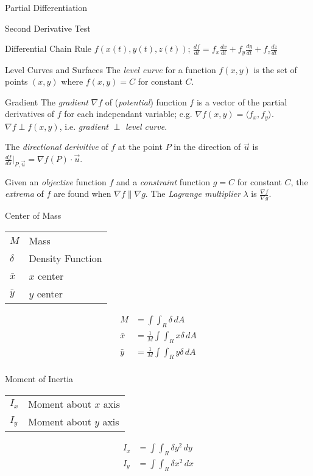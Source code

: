 \begin{section}{Partial Differentiation}
\begin{section}{Second Derivative Test}
  \end{section}
  \begin{section}{Differential Chain Rule}
    $f(x(t),y(t),z(t))$;
    $\frac{df}{dt}=
    f_{x}\frac{dx}{dt} + f_{y}\frac{dy}{dt} + f_{z}\frac{dz}{dt}$
  \end{section}

  \begin{section}{Level Curves and Surfaces}
    The \emph{level curve} for a function $f(x,y)$ is the set of
    points $(x,y)$ where $f(x,y)=C$ for constant $C$.
  \end{section}

  \begin{section}{Gradient}
    The \emph{gradient} $\nabla{f}$ of (\emph{potential})
    function $f$ is a vector of the
    partial derivatives of $f$ for each independant variable; e.g.
    $\nabla f(x,y) = \langle f_x,f_y \rangle $.
    $\nabla{f} \perp f(x,y)$, i.e.  \emph{gradient} $\perp$
    \emph{level curve}.

    The \emph{directional derivitive} of $f$ at the point $P$ in the
    direction of $\vec{u}$ is
    $\frac{df}{ds}\biggr\rvert_{P,\vec{u}}=\nabla{f}(P)\cdot\vec{u}$.

    Given an \emph{objective} function $f$ and a \emph{constraint}
    function $g=C$ for constant $C$, the \emph{extrema} of $f$
    are found when $\nabla{f} \parallel \nabla{g}$. The
    \emph{Lagrange multiplier} $\lambda$ is
    $\frac{\nabla{f}}{\nabla{g}}$.
  \end{section}
  \begin{section}{Center of Mass}
    \begin{tabular}{l l}
      $M$ & Mass\\
      $\delta$ & Density Function\\
      $\bar{x}$ & $x$ center\\
      $\bar{y}$ & $y$ center\\
    \end{tabular}
    \begin{align*}
      M&=\int\int_R{\delta} \,dA\\
      \bar{x}&=\frac{1}{M}\int\int_R{x\delta} \,dA\\
      \bar{y}&=\frac{1}{M}\int\int_R{y\delta} \,dA\\
    \end{align*}
  \end{section}

  \begin{section}{Moment of Inertia}
    \begin{tabular}{l l}
      $I_x$ & Moment about $x$ axis \\
      $I_y$ & Moment about $y$ axis \\
    \end{tabular}
    \begin{align*}
      I_x&=\int\int_R{\delta}y^2 \,dy\\
      I_y&=\int\int_R{\delta}x^2 \,dx\\
    \end{align*}
  \end{section}


\end{section}
